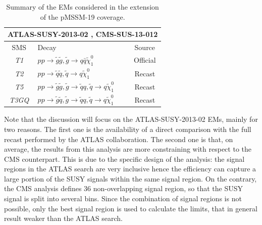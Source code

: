 \documentclass[a4paper,11pt]{article}
\newcommand{\TGQ}{ \textit{T3GQ}}
\newcommand{\Ttwo}{ \textit{T2}}
\newcommand{\Tfive}{ \textit{T5}}
\begin{document}
% 
\begin{table}
	\begin{center}
		\small
		\renewcommand{\arraystretch}{0.9}
		\begin{tabular}{ c l c}  \toprule  \toprule 
			\multicolumn{3}{c}{ATLAS-SUSY-2013-02 , CMS-SUS-13-012} \\ \toprule 
			SMS & Decay & Source \\ \toprule
			\textit{T1} &  $ p p \rightarrow \tilde g \tilde g, \tilde g \rightarrow q \bar q \tilde \chi_1 ^0 $ & Official \\
			\Ttwo & $  p p \rightarrow \tilde q \tilde q , \tilde q \rightarrow q \tilde \chi_1 ^0 $&  Recast\\
			\Tfive & $p p \rightarrow \tilde g \tilde g , \tilde g \rightarrow \tilde q q,  \tilde q \rightarrow q \tilde \chi_1 ^0 $& Recast  \\
			\TGQ & $ p p \rightarrow \tilde g \tilde q, \tilde g \rightarrow \tilde q q,  \tilde q \rightarrow q \tilde \chi_1 ^0 $ & Recast \\  
			\bottomrule \bottomrule                                             
		\end{tabular}
	\end{center}
	\caption{Summary of the EMs considered in the extension of the pMSSM-19 coverage.}
	\label{EMS}
\end{table}
\normalsize
Note that the discussion will focus on the ATLAS-SUSY-2013-02 EMs, mainly for two reasons. The first one is the availability of a direct comparison with the full recast performed by the ATLAS collaboration. The second one is that, on average, the results from this analysis are more constraining with respect to the CMS counterpart. This is due to the specific design of the analysis: the signal regions in the ATLAS search are very inclusive hence the efficiency can capture a large portion of the SUSY signals within the same signal region. On the contrary, the CMS analysis defines 36 non-overlapping signal region, so that the SUSY signal is split into several bins. Since the combination of signal regions is not possible, only the best signal region is used to calculate the limits, that in general result weaker than the ATLAS search.
%
\end{document}

